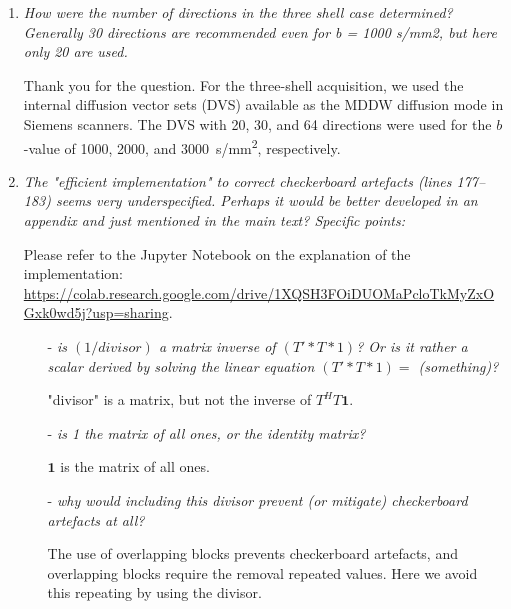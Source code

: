 \documentclass[a4paper,11pt,twoside]{report}
\begin{document}
\begin{enumerate}
    \item \textit{How were the number of directions in the three shell case determined? Generally 30 directions are recommended even for b = 1000 s/mm2, but here only 20 are used.}

    \hspace{1em} Thank you for the question.
    For the three-shell acquisition, we used the internal diffusion vector sets (DVS)
    available as the MDDW diffusion mode in Siemens scanners.
    The DVS with 20, 30, and 64 directions were used
    for the $b$-value of \num{1000}, \num{2000}, and \SI{3000}{s/mm^2},
    respectively.

    \item \textit{The "efficient implementation" to correct checkerboard artefacts (lines 177--183) seems very underspecified. Perhaps it would be better developed in an appendix and just mentioned in the main text? Specific points:}

    \hspace{1em} Please refer to the Jupyter Notebook on the explanation of the implementation:
    \url{https://colab.research.google.com/drive/1XQSH3FOiDUOMaPcloTkMyZxOGxk0wd5j?usp=sharing}.

        \begin{itemize}
            \item [-] \textit{is $(1/divisor)$ a matrix inverse of $(T'*T*1)$? Or is it rather a scalar derived by solving the linear equation $(T'*T*1) =$ (something)?}

            \hspace{0.5em} "divisor" is a matrix, but not the inverse of $T^H T \mathbf{1}$.

            \item [-] \textit{is 1 the matrix of all ones, or the identity matrix?}

            \hspace{0.5em} $\mathbf{1}$ is the matrix of all ones.

            \item [-] \textit{why would including this divisor prevent (or mitigate) checkerboard artefacts at all?}

            \hspace{0.5em} The use of overlapping blocks prevents checkerboard artefacts, and overlapping blocks require the removal repeated values.
            Here we avoid this repeating by using the divisor.

        \end{itemize}
\end{enumerate}
\end{document}
